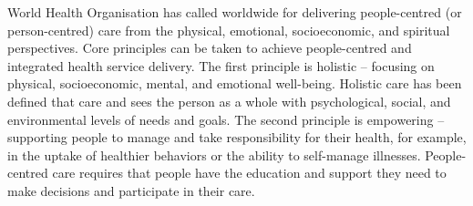 \documentclass[jpm,article,submit,moreauthors,pdftex]{Definitions/mdpi}
\begin{document}
\begin{paracol}{2}
%
World Health Organisation has called worldwide for delivering people-centred (or person-centred) care from the physical, emotional, socioeconomic, and spiritual perspectives\cite{WHO2015}\cite{Ling-ChengMong2021}.
Core principles can be taken to achieve people-centred and integrated health service delivery. 
The first principle is holistic – focusing on physical, socioeconomic, mental, and emotional well-being. 
Holistic care has been defined that care and sees the person as a whole with psychological, social, and environmental levels of needs and goals.
The second principle is empowering – supporting people to manage and take responsibility for their health,
for example, in the uptake of healthier behaviors or the ability to self-manage illnesses.
People-centred care requires that people have the education and support they need to make decisions and participate in their care.



\end{paracol}
\end{document}
